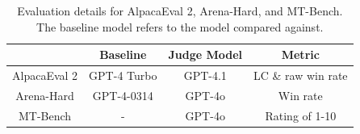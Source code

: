 

\begin{table}[]
\setlength{\tabcolsep}{1.5pt}
\centering
\footnotesize
\begin{tabular}{cccc}
\hline
                 & Baseline & Judge Model & Metric             \\ \hline
AlpacaEval 2        & GPT-4 Turbo    & GPT-4.1     & LC \& raw win rate \\
Arena-Hard         & GPT-4-0314         & GPT-4o     & Win rate           \\
MT-Bench            & -              & GPT-4o     & Rating of 1-10     \\ \hline
\end{tabular}
\caption{Evaluation details for AlpacaEval 2, Arena-Hard, and MT-Bench. The baseline model refers to the model compared against.}
\label{tab:evaluation_details}
\vspace{-1em}
\end{table}

